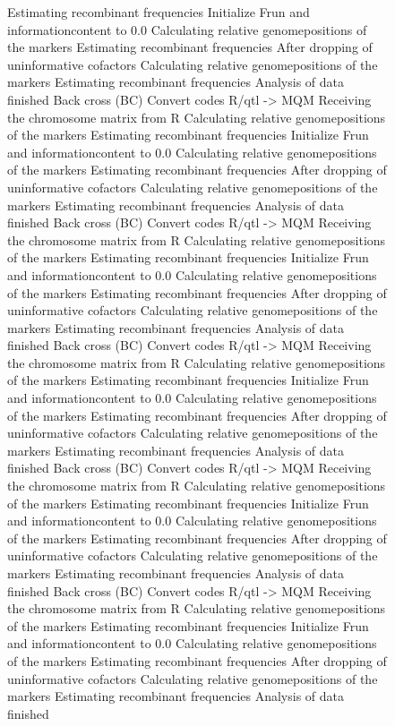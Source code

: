 \documentclass[11pt]{article}
\begin{document}
\begin{figure}[ht]
\begin{Schunk}
\begin{Soutput}
Estimating recombinant frequencies
Initialize Frun and informationcontent to 0.0
Calculating relative genomepositions of the markers
Estimating recombinant frequencies
After dropping of uninformative cofactors
Calculating relative genomepositions of the markers
Estimating recombinant frequencies
Analysis of data finished
Back cross (BC)
Convert codes R/qtl -> MQM
Receiving the chromosome matrix from R
Calculating relative genomepositions of the markers
Estimating recombinant frequencies
Initialize Frun and informationcontent to 0.0
Calculating relative genomepositions of the markers
Estimating recombinant frequencies
After dropping of uninformative cofactors
Calculating relative genomepositions of the markers
Estimating recombinant frequencies
Analysis of data finished
Back cross (BC)
Convert codes R/qtl -> MQM
Receiving the chromosome matrix from R
Calculating relative genomepositions of the markers
Estimating recombinant frequencies
Initialize Frun and informationcontent to 0.0
Calculating relative genomepositions of the markers
Estimating recombinant frequencies
After dropping of uninformative cofactors
Calculating relative genomepositions of the markers
Estimating recombinant frequencies
Analysis of data finished
Back cross (BC)
Convert codes R/qtl -> MQM
Receiving the chromosome matrix from R
Calculating relative genomepositions of the markers
Estimating recombinant frequencies
Initialize Frun and informationcontent to 0.0
Calculating relative genomepositions of the markers
Estimating recombinant frequencies
After dropping of uninformative cofactors
Calculating relative genomepositions of the markers
Estimating recombinant frequencies
Analysis of data finished
Back cross (BC)
Convert codes R/qtl -> MQM
Receiving the chromosome matrix from R
Calculating relative genomepositions of the markers
Estimating recombinant frequencies
Initialize Frun and informationcontent to 0.0
Calculating relative genomepositions of the markers
Estimating recombinant frequencies
After dropping of uninformative cofactors
Calculating relative genomepositions of the markers
Estimating recombinant frequencies
Analysis of data finished
Back cross (BC)
Convert codes R/qtl -> MQM
Receiving the chromosome matrix from R
Calculating relative genomepositions of the markers
Estimating recombinant frequencies
Initialize Frun and informationcontent to 0.0
Calculating relative genomepositions of the markers
Estimating recombinant frequencies
After dropping of uninformative cofactors
Calculating relative genomepositions of the markers
Estimating recombinant frequencies
Analysis of data finished

\end{Soutput}
\end{Schunk}
\end{figure}
\end{document}
